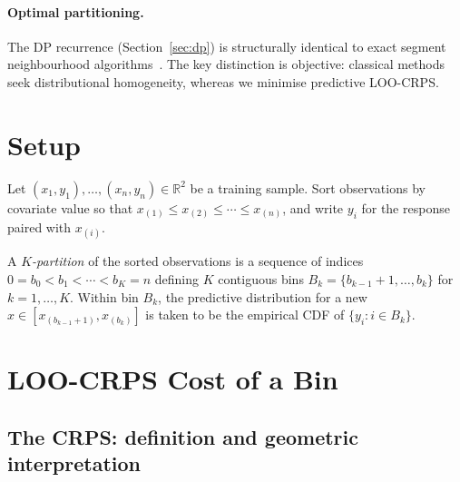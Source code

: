 \documentclass[11pt]{article}
\begin{document}
\paragraph{Optimal partitioning.}
The DP recurrence (Section~\ref{sec:dp}) is structurally identical to exact segment
neighbourhood algorithms~\citep{AugerLawrence1989,KillickEtAl2012}.
The key distinction is objective: classical methods seek distributional homogeneity,
whereas we minimise predictive LOO-CRPS.

\section{Setup}
\label{sec:setup}

Let $(x_1, y_1), \ldots, (x_n, y_n) \in \mathbb{R}^2$ be a training sample.
Sort observations by covariate value so that $x_{(1)} \le x_{(2)} \le \cdots \le x_{(n)}$,
and write $y_i$ for the response paired with $x_{(i)}$.

A \emph{$K$-partition} of the sorted observations is a sequence of indices
$0 = b_0 < b_1 < \cdots < b_K = n$ defining $K$ contiguous bins
$B_k = \{b_{k-1}+1, \ldots, b_k\}$ for $k = 1, \ldots, K$.
Within bin $B_k$, the predictive distribution for a new $x \in [x_{(b_{k-1}+1)}, x_{(b_k)}]$
is taken to be the empirical CDF of $\{y_i : i \in B_k\}$.

\section{LOO-CRPS Cost of a Bin}
\label{sec:cost}

\subsection*{The CRPS: definition and geometric interpretation}
\end{document}
